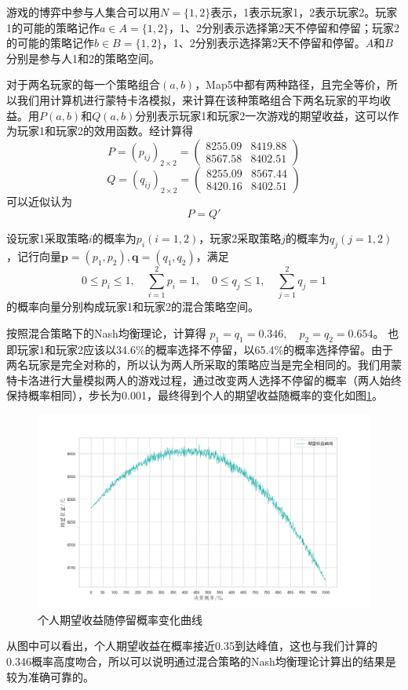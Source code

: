 \documentclass[withoutpreface,bwprint]{cumcmthesis} %
\begin{document}
游戏的博弈中参与人集合可以用$N=\{1,2\}$表示，1表示玩家1，2表示玩家2。玩家1的可能的策略记作$a\in A=\{1,2\}$，1、2分别表示选择第2天不停留和停留；玩家2的可能的策略记作$b\in B=\{1,2\}$，1、2分别表示选择第2天不停留和停留。$A$和$B$分别是参与人1和2的策略空间。

对于两名玩家的每一个策略组合$(a,b)$，Map5中都有两种路径，且完全等价，所以我们用计算机进行蒙特卡洛模拟，来计算在该种策略组合下两名玩家的平均收益。用$P(a,b)$和$Q(a,b)$分别表示玩家1和玩家2一次游戏的期望收益，这可以作为玩家1和玩家2的效用函数。经计算得
\begin{equation}
	P=(p_{ij})_{2\times2}=\begin{pmatrix}
	8255.09&8419.88\\8567.58&8402.51
	\end{pmatrix}
\end{equation}
\begin{equation}
    Q=(q_{ij})_{2\times2}=\begin{pmatrix}
    8255.09&8567.44\\
    8420.16&8402.51
    \end{pmatrix}
\end{equation}
可以近似认为$$P=Q'$$

设玩家1采取策略$i$的概率为$p_i(i=1,2)$，玩家2采取策略$j$的概率为$q_j(j=1,2)$，记行向量$\mathbf{p}=(p_1,p_2),\mathbf{q}=(q_1,q_2)$，满足
$$0\leqslant p_i\leqslant1,\quad\sum_{i=1}^{2}p_i=1,\quad0\leqslant q_j\leqslant1,\quad\sum_{j=1}^{2}q_j=1$$
的概率向量分别构成玩家1和玩家2的混合策略空间。

按照混合策略下的Nash均衡理论，计算得
$p_1=q_1=0.346,\quad p_2=q_2=0.654$。
也即玩家1和玩家2应该以34.6\%的概率选择不停留，以65.4\%的概率选择停留。由于两名玩家是完全对称的，所以认为两人所采取的策略应当是完全相同的。我们用蒙特卡洛进行大量模拟两人的游戏过程，通过改变两人选择不停留的概率（两人始终保持概率相同），步长为0.001，最终得到个人的期望收益随概率的变化如图\ref{fig:shouyi}。
\begin{figure}[H]
	\centering
	\includegraphics[scale=0.6]{figures/shouyi}
	\caption{个人期望收益随停留概率变化曲线}
	\label{fig:shouyi}
\end{figure}
从图中可以看出，个人期望收益在概率接近0.35到达峰值，这也与我们计算的0.346概率高度吻合，所以可以说明通过混合策略的Nash均衡理论计算出的结果是较为准确可靠的。
\end{document}
